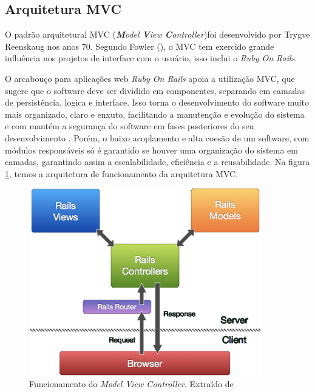 \subsection{Arquitetura MVC}
\label{sub:arquiteturamvc}

O padrão arquitetural MVC (\textit{\textbf{M}odel \textbf{V}iew \textbf{C}ontroller})foi desenvolvido por Trygve Reenskaug nos anos 70. Segundo Fowler (\citeyear{fowler2006padroes}), o MVC tem exercido grande influência nos projetos de interface com o usuário, isso inclui o \textit{Ruby On Rails}.

O arcabouço para aplicações web \textit{Ruby On Rails} apoia a utilização  MVC, que sugere que o software deve ser dividido em componentes, separando em camadas de persistência, logica e interface. Isso torna o desenvolvimento do software muito mais organizado, claro e enxuto, facilitando a manutenção e evolução do sistema e com mantém a segurança do software em fases posteriores do seu desenvolvimento \cite{silva2012mvc}. Porém, o baixo acoplamento e alta coesão de um software, com módulos responsáveis só é garantido se houver uma organização do sistema em camadas, garantindo assim a escalabilidade, eficiência e a reusabilidade. Na figura \ref{fig:figuramvc}, temos a arquitetura de funcionamento da arquitetura MVC.

\graphicspath{{figuras/}}
\begin{figure}[H]
\centering
\includegraphics[width=0.9\textwidth]{funcionamentomvc}
\caption[Funcionamento do \textit{Model View Controller}]{Funcionamento do \textit{Model View Controller}. Extraído de \cite{monim2013mvc}}
\label{fig:figuramvc}
\end{figure}

